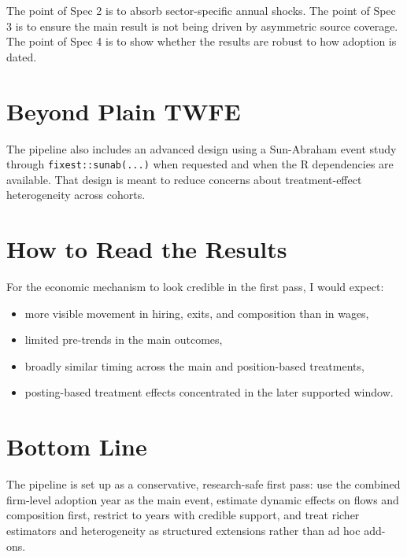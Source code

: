 \documentclass[11pt]{article}
\begin{document}
The point of Spec 2 is to absorb sector-specific annual shocks. The point of Spec 3 is to ensure the main result is not being driven by asymmetric source coverage. The point of Spec 4 is to show whether the results are robust to how adoption is dated.

\section*{Beyond Plain TWFE}

The pipeline also includes an advanced design using a Sun-Abraham event study through \texttt{fixest::sunab(...)} when requested and when the R dependencies are available. That design is meant to reduce concerns about treatment-effect heterogeneity across cohorts.

\section*{How to Read the Results}

For the economic mechanism to look credible in the first pass, I would expect:

\begin{itemize}[leftmargin=1.5em]
    \item more visible movement in hiring, exits, and composition than in wages,
    \item limited pre-trends in the main outcomes,
    \item broadly similar timing across the main and position-based treatments,
    \item posting-based treatment effects concentrated in the later supported window.
\end{itemize}

\section*{Bottom Line}

The pipeline is set up as a conservative, research-safe first pass: use the combined firm-level adoption year as the main event, estimate dynamic effects on flows and composition first, restrict to years with credible support, and treat richer estimators and heterogeneity as structured extensions rather than ad hoc add-ons.
\end{document}
